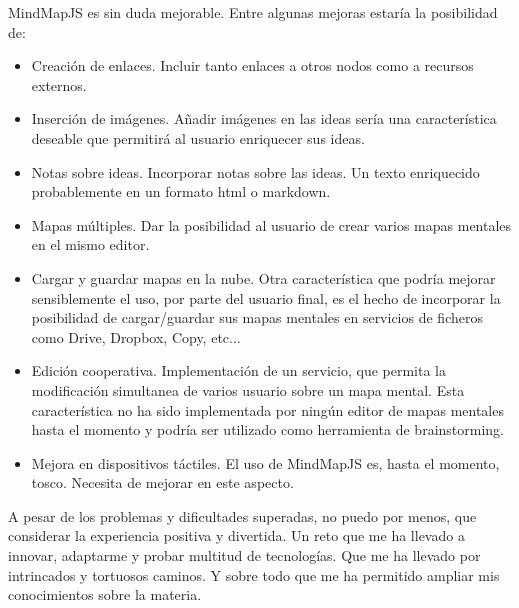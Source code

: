 MindMapJS es sin duda mejorable. Entre algunas mejoras estaría la posibilidad de:
\begin{itemize}
\item Creación de enlaces. Incluir tanto enlaces a otros nodos como a recursos externos.
\item Inserción de imágenes. Añadir imágenes en las ideas sería una característica deseable que permitirá al usuario enriquecer sus ideas.
\item Notas sobre ideas. Incorporar notas sobre las ideas. Un texto enriquecido probablemente en un formato html o markdown.
\item Mapas múltiples. Dar la posibilidad al usuario de crear varios mapas mentales en el mismo editor. 
\item Cargar y guardar mapas en la nube. Otra característica que podría mejorar sensiblemente el uso, por parte del usuario final, es el hecho de incorporar la posibilidad de cargar/guardar sus mapas mentales en servicios de ficheros como Drive, Dropbox, Copy, etc...
\item Edición cooperativa. Implementación de un servicio, que permita la modificación simultanea de varios usuario sobre un mapa mental. Esta característica no ha sido implementada por ningún editor de mapas mentales hasta el momento y podría ser utilizado como herramienta de brainstorming. 
\item Mejora en dispositivos táctiles. El uso de MindMapJS es, hasta el momento, tosco. Necesita de mejorar en este aspecto.
\end{itemize}

A pesar de los problemas y dificultades superadas, no puedo por menos, que considerar la experiencia positiva y divertida. Un reto que me ha llevado a innovar, adaptarme y probar multitud de tecnologías. Que me ha llevado por intrincados y tortuosos caminos. Y sobre todo que me ha permitido ampliar mis conocimientos sobre la materia. 
